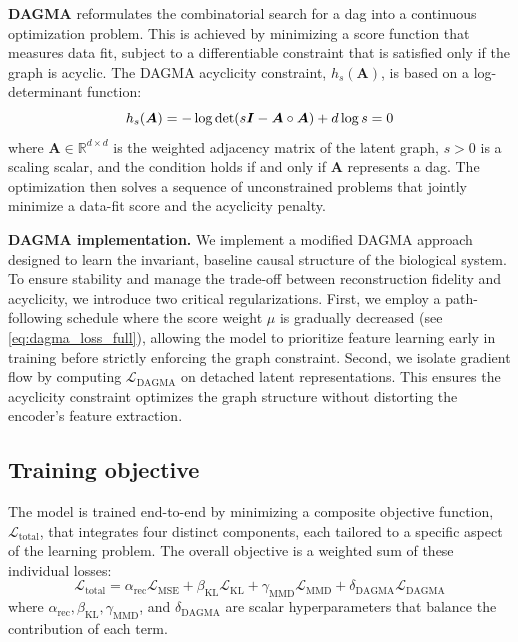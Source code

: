 \documentclass[10pt,letterpaper]{article}
\def\mA{{\bm{A}}}\def\mB{{\bm{B}}}\def\mC{{\bm{C}}}
\theoremstyle{definition}
\theoremstyle{remark}
\newcommand{\realnumbers}{\mathbb{R}}
\newcommand{\identitymatrix}{\mI}
\newcommand{\graphmatrix}{\mA}
\newcommand{\latentdim}{d}
\newcommand{\mseloss}{\mathcal{L}_{\text{MSE}}}
\newcommand{\kldloss}{\mathcal{L}_{\text{KL}}}
\newcommand{\mmdloss}{\mathcal{L}_{\text{MMD}}}
\newcommand{\dagmaloss}{\mathcal{L}_{\text{DAGMA}}}
\newcommand{\totalloss}{\mathcal{L}_{\text{total}}}
\newcommand{\acyclicityfunc}{h}
\newcommand{\alpharec}{\alpha_{\text{rec}}}
\newcommand{\betakl}{\beta_{\text{KL}}}
\newcommand{\gammammd}{\gamma_{\text{MMD}}}
\newcommand{\deltadagma}{\delta_{\text{DAGMA}}}
\begin{document}
\textbf{DAGMA} reformulates the combinatorial search for a \gls{dag} into a continuous optimization problem.
This is achieved by minimizing a score function that measures data fit, subject to a differentiable constraint that is satisfied only if the graph is acyclic.
The DAGMA acyclicity constraint, $\acyclicityfunc_s(\graphmatrix)$, is based on a log-determinant function:
\begin{equation}
    \acyclicityfunc_s(\graphmatrix) = -\log\det(s\identitymatrix - \graphmatrix \circ \graphmatrix) + \latentdim\log s = 0
\end{equation}
where $\graphmatrix \in \realnumbers^{\latentdim \times \latentdim}$ is the weighted adjacency matrix of the latent graph, $s > 0$ is a scaling scalar, and the condition holds if and only if $\graphmatrix$ represents a \gls{dag}.
The optimization then solves a sequence of unconstrained problems that jointly minimize a data-fit score and the acyclicity penalty.

\textbf{DAGMA implementation.} We implement a modified DAGMA approach designed to learn the invariant, baseline causal structure of the biological system.
To ensure stability and manage the trade-off between reconstruction fidelity and acyclicity, we introduce two critical regularizations.
First, we employ a path-following schedule where the score weight $\mu$ is gradually decreased (see \cref{eq:dagma_loss_full}), allowing the model to prioritize feature learning early in training before strictly enforcing the graph constraint.
Second, we isolate gradient flow by computing $\dagmaloss$ on detached latent representations.
This ensures the acyclicity constraint optimizes the graph structure without distorting the encoder's feature extraction.

\subsection*{Training objective}
The model is trained end-to-end by minimizing a composite objective function, $\totalloss$, that integrates four distinct components, each tailored to a specific aspect of the learning problem.
The overall objective is a weighted sum of these individual losses:
\begin{equation}
    \totalloss = \alpharec\mseloss + \betakl\kldloss + \gammammd\mmdloss + \deltadagma\dagmaloss
    \label{eq:total_loss}
\end{equation}
where $\alpharec, \betakl, \gammammd$, and $\deltadagma$ are scalar hyperparameters that balance the contribution of each term.
\end{document}
